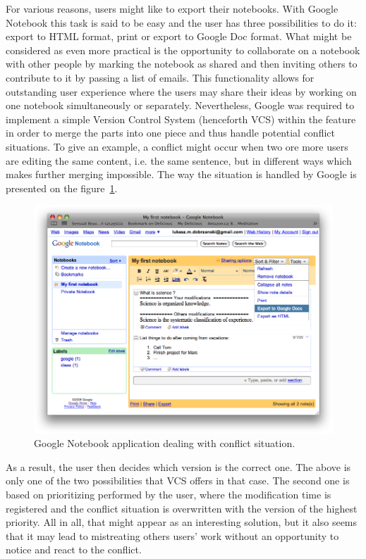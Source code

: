 For various reasons, users might like to export their notebooks. With Google Notebook this task is said to be easy and the user has three possibilities to do it: export to HTML format, print or export to Google Doc format. What might be considered as even more practical is the opportunity to collaborate on a notebook with other people by marking the notebook as shared and then inviting others to contribute to it by passing a list of emails. This functionality allows for outstanding user experience where the users may share their ideas by working on one notebook simultaneously or separately. Nevertheless, Google was required to implement a simple Version Control System (henceforth VCS) within the feature in order to merge the parts into one piece and thus handle potential conflict situations. To give an example, a conflict might occur when two ore more users are editing the same content, i.e. the same sentence, but in different ways which makes further merging impossible. The way the situation is handled by Google is presented on the figure~\ref{fig:google_notebook}. 
\begin{figure}[ht]
\begin{center}
\includegraphics[scale=0.38]{img/google_notebook_conflict.png}
\caption{Google Notebook application dealing with conflict situation.}
\label{fig:google_notebook}
\end{center}
\end{figure}
As a result, the user then decides which version is the correct one. The above is only one of the two possibilities that VCS offers in that case. The second one is based on prioritizing performed by the user, where the modification time is registered and the conflict situation is overwritten with the version of the highest priority. All in all, that might appear as an interesting solution, but it also seems that it may lead to mistreating others users' work without an opportunity to notice and react to the conflict.

